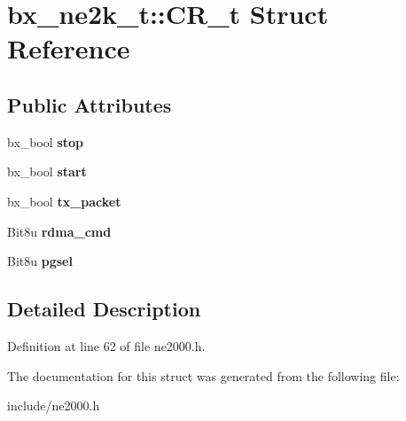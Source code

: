 \hypertarget{structbx__ne2k__t_1_1CR__t}{\section{bx\-\_\-ne2k\-\_\-t\-:\-:C\-R\-\_\-t Struct Reference}
\label{structbx__ne2k__t_1_1CR__t}
}
\subsection*{Public Attributes}
\begin{DoxyCompactItemize}
\item 
\hypertarget{structbx__ne2k__t_1_1CR__t_a45227030a2b00708acbd956671f101ac}{bx\-\_\-bool {\bfseries stop}}\label{structbx__ne2k__t_1_1CR__t_a45227030a2b00708acbd956671f101ac}

\item 
\hypertarget{structbx__ne2k__t_1_1CR__t_a72b679061e1da0d0eb6a5aef3d00334e}{bx\-\_\-bool {\bfseries start}}\label{structbx__ne2k__t_1_1CR__t_a72b679061e1da0d0eb6a5aef3d00334e}

\item 
\hypertarget{structbx__ne2k__t_1_1CR__t_a4edd1a506e5592dc3249a736d0b2e232}{bx\-\_\-bool {\bfseries tx\-\_\-packet}}\label{structbx__ne2k__t_1_1CR__t_a4edd1a506e5592dc3249a736d0b2e232}

\item 
\hypertarget{structbx__ne2k__t_1_1CR__t_a256ccfb84ee21ba1169a5b47ef9ad29c}{Bit8u {\bfseries rdma\-\_\-cmd}}\label{structbx__ne2k__t_1_1CR__t_a256ccfb84ee21ba1169a5b47ef9ad29c}

\item 
\hypertarget{structbx__ne2k__t_1_1CR__t_a5af14e5240a1e1c8629dca971ab372cf}{Bit8u {\bfseries pgsel}}\label{structbx__ne2k__t_1_1CR__t_a5af14e5240a1e1c8629dca971ab372cf}

\end{DoxyCompactItemize}


\subsection{Detailed Description}


Definition at line 62 of file ne2000.\-h.



The documentation for this struct was generated from the following file\-:\begin{DoxyCompactItemize}
\item 
include/ne2000.\-h\end{DoxyCompactItemize}
